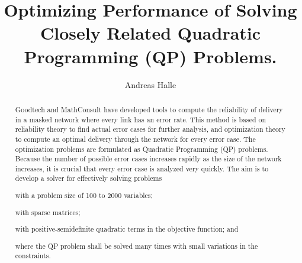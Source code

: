 \documentclass[a4paper,12pt]{report}
\begin{document}
\newcommand*\printpoint[2]{(%
\pgfmathparse{0.03514598035*#1}\pgfmathprintnumber{\pgfmathresult},%
\pgfmathparse{0.03514598035*#2}\pgfmathprintnumber{\pgfmathresult})%
}

\title{Optimizing Performance of Solving Closely Related Quadratic Programming
       (QP) Problems.}

\author{Andreas Halle}



\maketitle
\tableofcontents
\begin{abstract}
Goodtech and MathConsult have developed tools to compute the reliability of
delivery in a masked network where every link has an error rate.
This method is based on reliability theory to find actual error cases for
further analysis, and optimization theory to compute an optimal delivery
through the network for every error case.
The optimization problems are formulated as Quadratic Programming (QP)
problems.
Because the number of possible error cases increases rapidly as the size of the
network increases, it is crucial that every error case is analyzed very
quickly.
The aim is to develop a solver for effectively solving problems
\begin{inparaenum}
  \item with a problem size of 100 to 2000 variables;
  \item with sparse matrices;
  \item with positive-semidefinite quadratic terms in the objective function;
        and
  \item where the QP problem shall be solved many times with small variations
        in the constraints.
\end{inparaenum}
\end{abstract}
\end{document}

